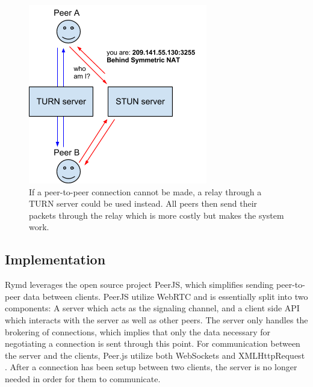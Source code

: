 \begin{figure}[htp]
\centering
\includegraphics[width=\textwidth,height=0.2\paperheight,keepaspectratio
]{figures/webrtc-turn}
\caption{If a peer-to-peer connection cannot be made, a relay through a TURN server could be used instead. All peers then send their packets through the relay which is more costly but makes the system work\cite{WebRTCArchitecture:2014:Online}.}
\label{fig:WebRTC - TURN}
\end{figure}

\subsection{Implementation}
\label{sec:p2p}

Rymd leverages the open source project PeerJS, which simplifies sending peer-to-peer data between clients. PeerJS utilize WebRTC and is essentially split into two components: A server which acts as the signaling channel, and a client side API which interacts with the server as well as other peers. The server only handles the brokering of connections, which implies that only the data necessary for negotiating a connection is sent through this point. For communication between the server and the clients, Peer.js utilize both WebSockets and XMLHttpRequest \cite{PeerjsGithub:2014:Online}. After a connection has been setup between two clients, the server is no longer needed in order for them to communicate.


